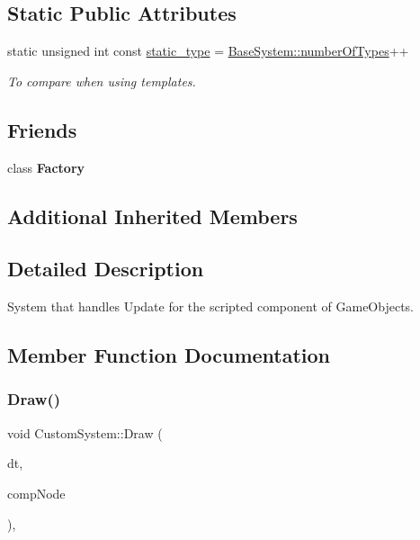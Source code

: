 \subsection*{Static Public Attributes}
\begin{DoxyCompactItemize}
\item 
\mbox{\label{classCustomSystem_a1c3d97bf73201a0c3e1c306440ff94a7}} 
static unsigned int const \hyperlink{classCustomSystem_a1c3d97bf73201a0c3e1c306440ff94a7}{static\+\_\+type} = \hyperlink{classBaseSystem_a7ef356edab3cfb02905e0a73a645b131}{Base\+System\+::number\+Of\+Types}++
\begin{DoxyCompactList}\small\item\em To compare when using templates. \end{DoxyCompactList}\end{DoxyCompactItemize}
\subsection*{Friends}
\begin{DoxyCompactItemize}
\item 
\mbox{\label{classCustomSystem_a328c093d609680cca505905c6d49901a}} 
class {\bfseries Factory}
\end{DoxyCompactItemize}
\subsection*{Additional Inherited Members}


\subsection{Detailed Description}
System that handles Update for the scripted component of Game\+Objects. 

\subsection{Member Function Documentation}
\mbox{\label{classCustomSystem_a6552a2339d179ca963650e94ee1bf615}} 
\subsubsection{\texorpdfstring{Draw()}{Draw()}}
{\footnotesize\ttfamily void Custom\+System\+::\+Draw (\begin{DoxyParamCaption}\item[{float}]{dt,  }\item[{\hyperlink{structBaseSystemCompNode}{Base\+System\+Comp\+Node} $\ast$}]{comp\+Node }\end{DoxyParamCaption})\hspace{0.3cm}{\ttfamily [override]}, {\ttfamily [virtual]}}



